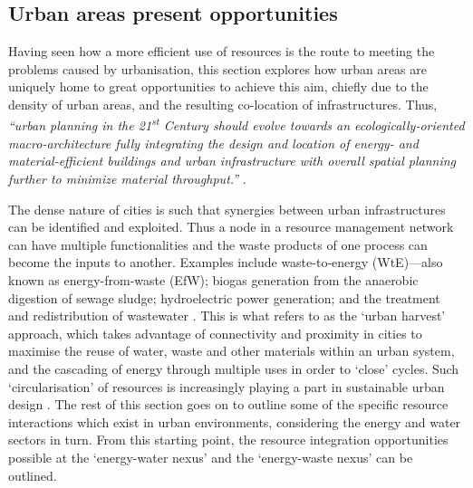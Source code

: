 \subsection{Urban areas present opportunities}
\label{sec:urbanOpps}
Having seen how a more efficient use of resources is the route to meeting the problems caused by urbanisation, this section explores how urban areas are uniquely home to great opportunities to achieve this aim, chiefly due to the density of urban areas, and the resulting co-location of infrastructures. Thus, \emph{``urban planning in the 21\textsuperscript{st} Century should evolve towards an ecologically-oriented macro-architecture fully integrating the design and location of energy- and material-efficient buildings and urban infrastructure with overall spatial planning further to minimize material throughput.''} \citep{Rees1999}. 

The dense nature of cities is such that synergies between urban infrastructures can be identified and exploited. Thus a node in a resource management network can have multiple functionalities and the waste products of one process can become the inputs to another. Examples include waste-to-energy (WtE)---also known as energy-from-waste (EfW); biogas generation from the anaerobic digestion of sewage sludge; hydroelectric power generation; and the treatment and redistribution of wastewater \citep{Kharrazi2012}. This is what \citet{Leduc2010} refers to as the `urban harvest' approach, which takes advantage of connectivity and proximity in cities to maximise the reuse of water, waste and other materials within an urban system, and the cascading of energy through multiple uses in order to `close' cycles. Such `circularisation' of resources is increasingly playing a part in sustainable urban design \citep{Meijer2011}. The rest of this section goes on to outline some of the specific resource interactions which exist in urban environments, considering the energy and water sectors in turn. From this starting point, the resource integration opportunities possible at the `energy-water nexus' and the `energy-waste nexus' can be outlined.

